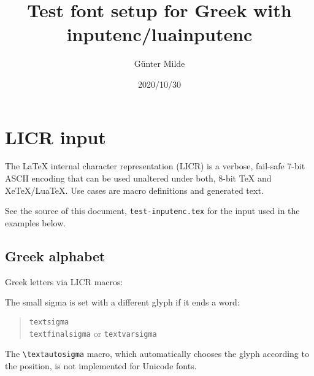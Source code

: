\documentclass[a4paper]{article}
\begin{document}
\hypersetup{pdfauthor=\textTau\'<\textepsilon\textsigma\textthetasymbol}

\title{Test font setup for Greek with inputenc/luainputenc}
\author{G\"unter Milde}
\date{2020/10/30}
\maketitle

\tableofcontents


\section{LICR input%
         \label{licr}}

The LaTeX internal character representation (LICR) is a verbose,
fail-safe 7-bit ASCII encoding that can be used unaltered under both, 8-bit
TeX and XeTeX/LuaTeX. Use cases are macro definitions and generated text.

See the source of this document,
\texttt{test-inputenc.tex} for the input used
in the examples below.


\subsection{Greek alphabet}

Greek letters via LICR macros:
\begin{quote}
  \textAlpha{} \textBeta{} \textGamma{} \textDelta{} \textEpsilon{}
  \textZeta{} \textEta{} \textTheta{} \textIota{} \textKappa{}
  \textLambda{} \textMu{} \textNu{} \textXi{} \textOmicron{} \textPi{}
  \textRho{} \textSigma{} \textTau{} \textUpsilon{} \textPhi{}
  \textChi{} \textPsi{} \textOmega{}

  \textalpha{} \textbeta{} \textgamma{} \textdelta{} \textepsilon{}
  \textzeta{} \texteta{} \texttheta{} \textiota{} \textkappa{}
  \textlambda{} \textmu{} \textnu{} \textxi{} \textomicron{} \textpi{}
  \textrho{} \textsigma{} \texttau{} \textupsilon{}
  \textphi{} \textchi{} \textpsi{} \textomega{}
\end{quote}
The small sigma is set with a different
glyph if it ends a word:
\begin{quote}
  \textsigma{}       \verb|textsigma|\\
  \textfinalsigma{}  \verb|textfinalsigma| or \verb|textvarsigma|
\end{quote}
The \verb|\textautosigma| macro, which automatically chooses the
glyph according to the position, is not implemented for Unicode fonts.
\end{document}
